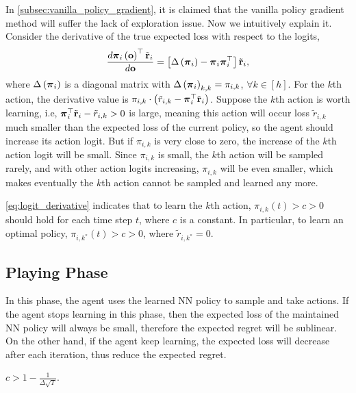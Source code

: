 In \cref{subsec:vanilla_policy_gradient}, it is claimed that the vanilla policy gradient method will suffer the lack of exploration issue. Now we intuitively explain it. Consider the derivative of the true expected loss with respect to the logits,
\begin{equation}
\label{eq:logit_derivative}
\begin{split}
    \frac{d {\boldsymbol{\pi}}_i\left( {\mathbf{o}} \right)^\top {\tilde{\mathbf{r}}}_i}{d {\mathbf{o}}} = \left[ \Delta\left( {\boldsymbol{\pi}}_i \right) - {\boldsymbol{\pi}}_i {\boldsymbol{\pi}}_i^\top \right] {\tilde{\mathbf{r}}}_i,
\end{split}
\end{equation}
where $\Delta\left( {\boldsymbol{\pi}}_i \right)$ is a diagonal matrix with $\Delta\left( {\boldsymbol{\pi}}_i \right)_{k,k} = \pi_{i,k}$, $\forall k \in [h]$. For the $k$th action, the derivative value is $\pi_{i,k} \cdot \left( \tilde{r}_{i,k} - {\boldsymbol{\pi}}_i^\top {\tilde{\mathbf{r}}}_i \right)$. Suppose the $k$th action is worth learning, i.e, ${\boldsymbol{\pi}}_i^\top {\tilde{\mathbf{r}}}_i - \tilde{r}_{i,k} > 0$ is large, meaning this action will occur loss $\tilde{r}_{i,k}$ much smaller than the expected loss of the current policy, so the agent should increase its action logit. But if $\pi_{i,k}$ is very close to zero, the increase of the $k$th action logit will be small. Since $\pi_{i,k}$ is small, the $k$th action will be sampled rarely, and with other action logits increasing, $\pi_{i,k}$ will be even smaller, which makes eventually the $k$th action cannot be sampled and learned any more.

\cref{eq:logit_derivative} indicates that to learn the $k$th action, $\pi_{i,k}(t) > c > 0$ should hold for each time step $t$, where $c$ is a constant. In particular, to learn an optimal policy, $\pi_{i,k^*}(t) > c > 0$, where $\tilde{r}_{i,k^*} = 0$.

\subsection{Playing Phase}
\label{subsec:playing_phase}

In this phase, the agent uses the learned NN policy to sample and take actions. If the agent stops learning in this phase, then the expected loss of the maintained NN policy will always be small, therefore the expected regret will be sublinear. On the other hand, if the agent keep learning, the expected loss will decrease after each iteration, thus reduce the expected regret.

\begin{lem}
    $c > 1 - \frac{1}{\Delta \sqrt{T}}$.
\end{lem}

